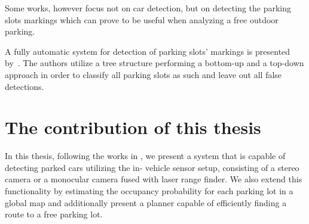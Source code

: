 Some works, however focus not on car detection, but on detecting the parking
slots markings which can prove to be useful when analyzing a free outdoor
parking.

A fully automatic system for detection of parking slots' markings is presented
by~\citet{suhr13}. The authors utilize a tree structure performing a bottom-up
and a top-down approach in order to classify all parking slots as such and
leave out all false detections.


\section{The contribution of this thesis} %
\label{sec:the_contribution_of_this_thesis}

In this thesis, following the works in , we
present a system that is capable of detecting parked cars utilizing the in-
vehicle sensor setup, consisting of a stereo camera or a monocular camera
fused with laser range finder. We also extend this functionality by estimating
the occupancy probability for each parking lot in a global map and
additionally present a planner capable of efficiently finding a route to a
free parking lot.


